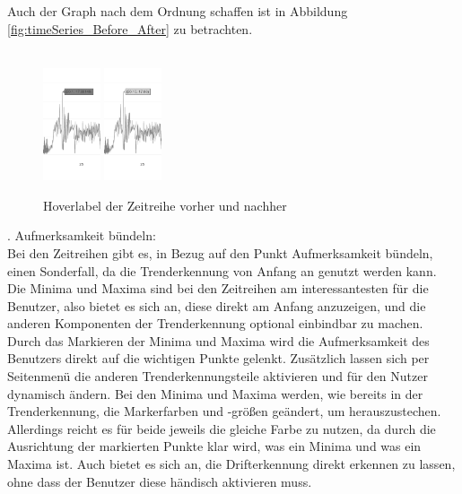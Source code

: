 Auch der Graph nach dem Ordnung schaffen ist in Abbildung \ref{fig:timeSeries_Before_After} zu betrachten.\\\\
\begin{figure}[h!]
\centering
\includegraphics[width=0.15\textwidth]{gfx/Zeitreihe_label_before.png} 
\hspace*{+2cm}\includegraphics[width=0.15\textwidth]{gfx/Zeitreihe_label_after.png}
\caption{Hoverlabel der Zeitreihe vorher und nachher}
\label{fig:timeSeries_label_Before_After}
\end{figure}
. Aufmerksamkeit bündeln:\\
Bei den Zeitreihen gibt es, in Bezug auf den Punkt Aufmerksamkeit bündeln, einen Sonderfall, da die Trenderkennung von Anfang an genutzt werden kann. Die Minima und Maxima sind bei den Zeitreihen am interessantesten für die Benutzer, also bietet es sich an, diese direkt am Anfang anzuzeigen, und die anderen Komponenten der Trenderkennung optional einbindbar zu machen. Durch das Markieren der Minima und Maxima wird die Aufmerksamkeit des Benutzers direkt auf die wichtigen Punkte gelenkt. Zusätzlich lassen sich per Seitenmenü die anderen Trenderkennungsteile aktivieren und für den Nutzer dynamisch ändern. Bei den Minima und Maxima werden, wie bereits in der Trenderkennung, die Markerfarben und -größen geändert, um herauszustechen. Allerdings reicht es für beide jeweils die gleiche Farbe zu nutzen, da durch die Ausrichtung der markierten Punkte klar wird, was ein Minima und was ein Maxima ist. Auch bietet es sich an, die Drifterkennung direkt erkennen zu lassen, ohne dass der Benutzer diese händisch aktivieren muss. \\\\
